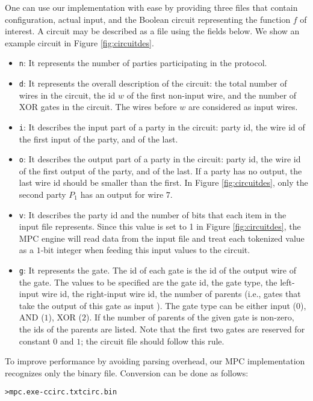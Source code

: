 \documentclass{article}
\begin{document}
One can use our implementation with ease by providing three files that
contain configuration, actual input, and the Boolean circuit
representing the function $f$ of interest.
%
A circuit may be described as a file using the fields below. We show
an example circuit in Figure \ref{fig:circuitdes}.
\begin{itemize}
\item
{\tt n}:
It represents the number of parties participating in the protocol.
\item
{\tt d}:
It represents the overall description of the circuit:  the total
number of wires in the circuit, the id $w$ of the first non-input
wire, and the number of XOR gates in the circuit. The wires before $w$
are considered as input wires.
\item
{\tt i}:
It describes the input part of a party in the circuit: party id, the
wire id of the first input of the party, and of the last.
\item
{\tt o}:
It describes the output part of a party in the circuit: party id, the
wire id of the first output of the party, and of the last. If a party
has no output, the last wire id should be smaller than the first. In
Figure \ref{fig:circuitdes}, only the second party $P_1$ has an output
for wire $7$.
\item
{\tt v}:
It describes the party id and the number of bits that each item in the
input file represents. Since this value is set to 1 in Figure
\ref{fig:circuitdes}, the MPC engine will read data from the input
file and  treat each tokenized value as a $1$-bit integer when feeding
this input values to the circuit.
\item
{\tt g}:
It represents the gate. The id of each gate is the id of the output
wire of the gate.  The values to be specified are the gate id, the
gate type, the left-input wire id, the right-input wire id, the number
of parents (i.e., gates that take the output of this
gate as input ).  The gate type can be either input ($0$), AND ($1$),
XOR ($2$). If the number of parents of the given gate is non-zero, the
ids of the parents are listed.   Note that the first two gates are
reserved for constant $0$ and $1$; the circuit file should follow this
rule.
\end{itemize}


To improve performance by avoiding parsing overhead, our MPC
implementation recognizes only the binary file. Conversion can be done
as follows:
\begin{alltt}
>mpc.exe -c circ.txt circ.bin
\end{alltt}
\end{document}
